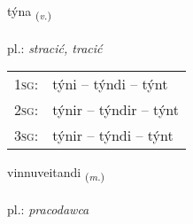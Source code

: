 \documentclass[frontgrid, backgrid]{flacards}\usepackage[]{graphicx}\usepackage[]{xcolor}
\begin{document}
\renewcommand{\flhead}{\vskip5pt \fboxsep=0pt {\small\bfseries\footnotesize Sagnorð | czasownik}}
\renewcommand{\fcfoot}{\vskip5pt \fboxsep=0pt \hspace{2pt}{\small\bfseries\footnotesize 3K}}

\renewcommand{\blhead}{\vskip5pt {\small\bfseries\footnotesize Sagnorð | czasownik }}
\renewcommand{\bcfoot}{\vskip5pt \hspace{2pt}{\small\bfseries\footnotesize 3K}}


{týna \small{\textsubscript{(\textit{v.})}} \\[1ex] %
\textphonetic{[tʰiːna]} \\
pl.: \emph{stracić, tracić} \\  [2ex]
\renewcommand*{\arraystretch}{0.8}
\begin{tabular}{p{1cm}l}
\textsc{1sg}: & týni -- týndi -- týnt \\ 
\textsc{2sg}: & týnir -- týndir -- týnt \\ 
\textsc{3sg}: & týnir -- týndi -- týnt \\ 
\end{tabular}
}

\renewcommand{\flhead}{\vskip5pt \fboxsep=0pt {\small\bfseries\footnotesize Nafnorð | rzeczownik}}
\renewcommand{\fcfoot}{\vskip5pt \fboxsep=0pt \hspace{2pt}{\small\bfseries\footnotesize 3K}}

\renewcommand{\blhead}{\vskip5pt {\small\bfseries\footnotesize Nafnorð | rzeczownik }}
\renewcommand{\bcfoot}{\vskip5pt \hspace{2pt}{\small\bfseries\footnotesize 3K}}


{vinnuveitandi \small{\textsubscript{(\textit{m.})}} \\[1ex] %
\textphonetic{[vɪnʏveitantɪ]} \\
pl.: \emph{pracodawca} \\  [2ex]
\renewcommand*{\arraystretch}{0.8}
}
\end{document}
